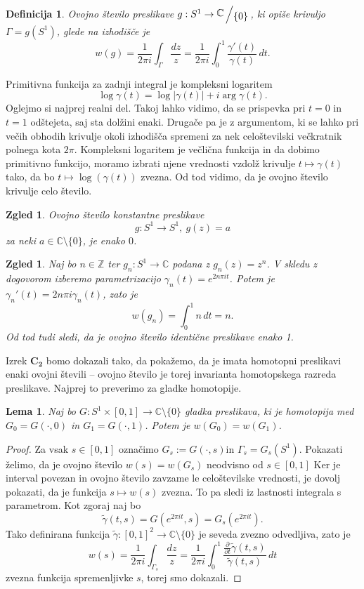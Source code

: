 \documentclass[10pt, a4paper]{article}
\newtheorem{defi}[izr]{Definicija}
\newenvironment{noticeB}{%
  \tcolorbox[%
  notitle,
  empty,
  enhanced,  %
  breakable,
  coltext=black,
  colback=white, 
  fontupper=\rmfamily,
  parbox=false,
  noparskip,
  sharp corners,
  boxrule=-1pt,  %
  frame hidden,
  left=7pt,  %
  right=7pt,
  top=5pt,
  bottom=5pt,
  before skip=2.5ex plus 2pt,
  after skip=2.5ex plus 2pt,
  borderline west = {1.5pt}{-0.1pt}{blue!30!black}, %
  overlay unbroken and last={%
    \draw[color=black, line width=1.25pt]
    ($(frame.south west)+(1.pt, -0.1pt)$) -- ++(2em, 0);
  }
  ]}
{\endtcolorbox}
\newenvironment{definicija}{\begin{defi}\begin{noticeB}}{%
    \end{noticeB}\end{defi}}
\newtheorem{zgled}[izr]{Zgled}
\newtheorem{lema}[izr]{Lema}
\newenvironment{noticeC}{%
  \tcolorbox[%
  notitle,
  empty,
  enhanced,  %
  breakable,
  coltext=black, 
  fontupper=\rmfamily,
  parbox=false,
  noparskip,
  sharp corners,
  boxrule=-1pt,  %
  frame hidden,
  left=7pt,  %
  right=7pt,
  top=5pt,
  bottom=5pt,
  before skip=2.5ex plus 2pt,
  after skip=2.5ex plus 2pt,
  overlay unbroken and last={%
  },
  ]}
{\endtcolorbox}
\newenvironment{dokaz}%
  {\begin{noticeC}\begin{proof}}%
  {\end{proof}\end{noticeC}}
\newcommand{\Z}{\mathbb {Z}}
\newcommand{\C}{\mathbb {C}}
\newcommand{\quot}[2]{{\raisebox{0.1em}{$#1$}\left/\raisebox{-0.2em}{$#2$}\right.}}
\begin{document}
\begin{definicija}
  Ovojno število preslikave $g: S^1 \to \quot{\C}{\{0\}}$, ki opiše krivuljo $\Gamma = g(S^1)$, glede na izhodišče 
  je 
  $$w(g) = \frac{1}{2 \pi i} \int_{\Gamma} \frac{dz}{z} = \frac{1}{2 \pi i} \int_0 ^1 \frac{\gamma'(t)}{\gamma(t)}\, dt.$$
\end{definicija}

Primitivna funkcija za zadnji integral je kompleksni logaritem 
$$\log \gamma(t) = \log |\gamma(t)| + i \arg \gamma(t).$$
Oglejmo si najprej realni del. Takoj lahko vidimo, da se prispevka pri 
$t = 0$ in $t = 1$ odštejeta, saj sta dolžini enaki.
Drugače pa je z argumentom, ki se lahko pri večih obhodih
krivulje okoli izhodišča spremeni za nek celoštevilski večkratnik 
polnega kota $2 \pi$. Kompleksni logaritem je večlična funkcija in 
da dobimo primitivno funkcijo, moramo izbrati njene vrednosti vzdolž krivulje 
$t \mapsto \gamma(t)$ tako, da bo $t \mapsto \log(\gamma(t))$ zvezna.
Od tod vidimo, da je ovojno število krivulje celo število.

\begin{zgled}
  Ovojno število konstantne preslikave $$g: S^1 \to S^1,\ g(z) = a$$
  za neki $a \in \C \setminus \{0\}$, je enako $0$.
\end{zgled}

\begin{zgled}
  Naj bo $n \in \Z$ ter $g_n : S^1 \to \C$ podana z $g_n(z) = z^n$.
  V skledu z dogovorom izberemo parametrizacijo $\gamma_n(t) = e^{2 n \pi i t}$.
  Potem je $\gamma_n '(t) = 2 n \pi i \gamma_n (t)$, zato je 
  $$w (g_n) = \int_0 ^1 n\, dt = n.$$
  Od tod tudi sledi, da je ovojno število identične preslikave enako 1.
\end{zgled}

Izrek $\mathbf{C_2}$ bomo dokazali tako, da pokažemo, da je imata 
homotopni preslikavi enaki ovojni števili -- ovojno število je torej 
invarianta homotopskega razreda preslikave.
Najprej to preverimo za gladke homotopije.

\begin{lema}
  Naj bo $G: S^1 \times [0, 1] \to \C \setminus \{0\}$ gladka preslikava, ki je homotopija med 
  $G_0 = G(\cdot , 0)$ in $G_1 = G(\cdot , 1)$. Potem je $w (G_0) = w (G_1)$.
\end{lema}

\begin{dokaz}
  Za vsak $s \in [0, 1]$ označimo $G_s := G(\cdot, s)$in $\Gamma_s = G_s (S^1)$.
  Pokazati želimo, da je ovojno število $w(s) = w(G_s)$ neodvisno od $s \in [0, 1]$
  Ker je interval povezan in ovojno število zavzame le celoštevilske vrednosti,
  je dovolj pokazati, da je funkcija $s \mapsto w(s)$ zvezna. To pa sledi iz lastnosti 
  integrala s parametrom. Kot zgoraj naj bo 
  $$\widetilde{\gamma} (t, s) = G(e^{2 \pi i t}, s) = G_s (e^{2 \pi i t}).$$
  Tako definirana funkcija $\widetilde{\gamma}: [0, 1]^2 \to \C \setminus \{0\}$ je seveda zvezno odvedljiva,
  zato je 
  $$w(s) = \frac{1}{2 \pi i} \int_{\Gamma_s} \frac{dz}{z} = \frac{1}{2 \pi i} \int_0 ^1 \frac{\frac{\partial}{\partial t} \widetilde{\gamma} (t, s)}{\widetilde{\gamma} (t, s)}\, dt$$
  zvezna funkcija spremenljivke $s$, torej smo dokazali. 
\end{dokaz}
\end{document}

